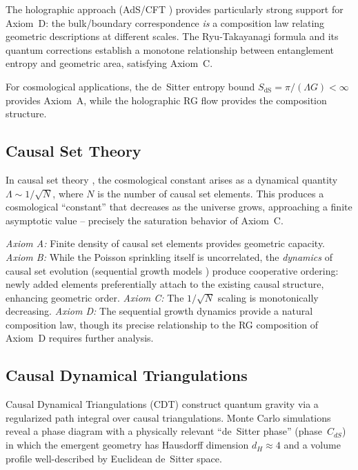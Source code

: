 \documentclass[aps,prd,twocolumn,superscriptaddress,nofootinbib]{revtex4-2}
\begin{document}
The holographic approach (AdS/CFT \cite{Maldacena1999}) provides particularly strong support for Axiom~D: the bulk/boundary correspondence \textit{is} a composition law relating geometric descriptions at different scales. The Ryu-Takayanagi formula \cite{Ryu2006} and its quantum corrections establish a monotone relationship between entanglement entropy and geometric area, satisfying Axiom~C.

For cosmological applications, the de~Sitter entropy bound $S_{\mathrm{dS}} = \pi/(\Lambda G) < \infty$ provides Axiom~A, while the holographic RG flow \cite{deBoer2000} provides the composition structure.

\subsection{Causal Set Theory}

In causal set theory \cite{Sorkin2003,Surya2019}, the cosmological constant arises as a dynamical quantity $\Lambda \sim 1/\sqrt{N}$, where $N$ is the number of causal set elements. This produces a cosmological ``constant'' that decreases as the universe grows, approaching a finite asymptotic value -- precisely the saturation behavior of Axiom~C.

\textit{Axiom A:} Finite density of causal set elements provides geometric capacity. \textit{Axiom B:} While the Poisson sprinkling itself is uncorrelated, the \textit{dynamics} of causal set evolution (sequential growth models \cite{Surya2019}) produce cooperative ordering: newly added elements preferentially attach to the existing causal structure, enhancing geometric order. \textit{Axiom C:} The $1/\sqrt{N}$ scaling is monotonically decreasing. \textit{Axiom D:} The sequential growth dynamics provide a natural composition law, though its precise relationship to the RG composition of Axiom~D requires further analysis.

\subsection{Causal Dynamical Triangulations}

Causal Dynamical Triangulations (CDT) \cite{Ambjorn2005,Loll2020} construct quantum gravity via a regularized path integral over causal triangulations. Monte Carlo simulations reveal a phase diagram with a physically relevant ``de~Sitter phase'' (phase~$C_{dS}$) in which the emergent geometry has Hausdorff dimension $d_H \approx 4$ and a volume profile well-described by Euclidean de~Sitter space.
\end{document}
